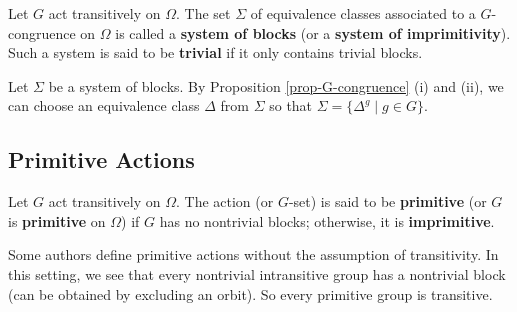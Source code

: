 \begin{definition}
	Let $G$ act transitively on $\Omega$. The set $\Sigma$ of equivalence classes associated to a $G$-congruence on $\Omega$ is called a \textbf{system of blocks} (or a \textbf{system of imprimitivity}). Such a system is said to be \textbf{trivial} if it only contains trivial blocks.
\end{definition}
\begin{remark}
Let $\Sigma$ be a system of blocks. By Proposition \ref{prop-G-congruence} (i) and (ii), we can choose an equivalence class $\Delta$ from $\Sigma$ so that $\Sigma = \{\Delta^g\mid g\in G\}$.
\end{remark}

\subsection{Primitive Actions}

\begin{definition}
	Let $G$ act transitively on $\Omega$. The action (or $G$-set) is said to be \textbf{primitive} (or $G$ is \textbf{primitive} on $\Omega$) if $G$ has no nontrivial blocks; otherwise, it is \textbf{imprimitive}.
\end{definition}
\begin{remark}
	Some authors define primitive actions without the assumption of transitivity. In this setting, we see that every nontrivial intransitive group has a nontrivial block (can be obtained by excluding an orbit). So every primitive group is transitive.
\end{remark}

